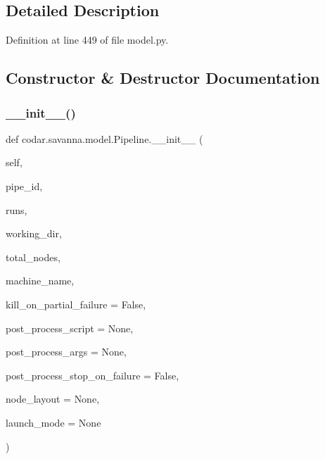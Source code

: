 \subsection{Detailed Description}


Definition at line 449 of file model.\+py.



\subsection{Constructor \& Destructor Documentation}
\mbox{\label{classcodar_1_1savanna_1_1model_1_1_pipeline_ada8df2357966f7e3cc7c34d3ee36f9a1}} 
\subsubsection{\texorpdfstring{\+\_\+\+\_\+init\+\_\+\+\_\+()}{\_\_init\_\_()}}
{\footnotesize\ttfamily def codar.\+savanna.\+model.\+Pipeline.\+\_\+\+\_\+init\+\_\+\+\_\+ (\begin{DoxyParamCaption}\item[{}]{self,  }\item[{}]{pipe\+\_\+id,  }\item[{}]{runs,  }\item[{}]{working\+\_\+dir,  }\item[{}]{total\+\_\+nodes,  }\item[{}]{machine\+\_\+name,  }\item[{}]{kill\+\_\+on\+\_\+partial\+\_\+failure = {\ttfamily False},  }\item[{}]{post\+\_\+process\+\_\+script = {\ttfamily None},  }\item[{}]{post\+\_\+process\+\_\+args = {\ttfamily None},  }\item[{}]{post\+\_\+process\+\_\+stop\+\_\+on\+\_\+failure = {\ttfamily False},  }\item[{}]{node\+\_\+layout = {\ttfamily None},  }\item[{}]{launch\+\_\+mode = {\ttfamily None} }\end{DoxyParamCaption})}



